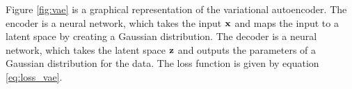 Figure \ref{fig:vae} is a graphical representation of the variational autoencoder. The encoder is a neural network, which takes 
the input $\bf{x}$ and maps the input to a latent space by creating a Gaussian distribution. The decoder is a neural network, 
which takes the latent space $\bf{z}$ and outputs the parameters of a Gaussian distribution for the data.
The loss function is given by equation \ref{eq:loss_vae}.